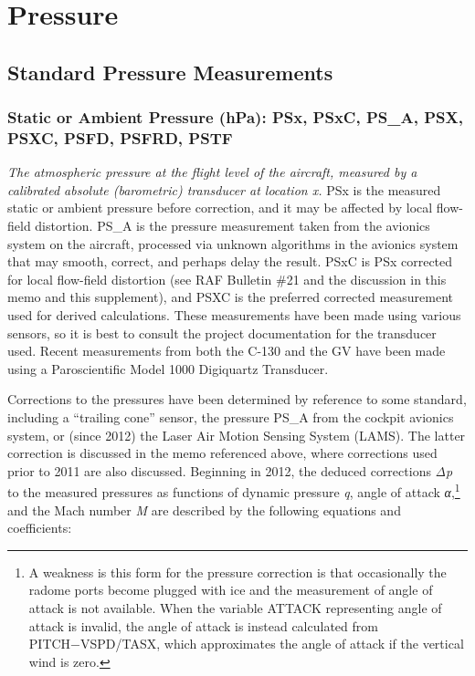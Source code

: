 \documentclass[
  english,
]{book}
\begin{document}
\hypertarget{pressure}{%
\section{Pressure}\label{pressure}}

\hypertarget{standard-pressure-measurements}{%
\subsection{Standard Pressure
Measurements}\label{standard-pressure-measurements}}

\hypertarget{psx}{%
\subsubsection*{Static or Ambient Pressure (hPa): PSx, PSxC, PS\_A, PSX,
PSXC, PSFD, PSFRD, PSTF}\label{psx}}

\emph{The atmospheric pressure at the flight level of the aircraft,
measured by a calibrated absolute (barometric) transducer at location
x.} PSx is the measured static or ambient pressure before correction,
and it may be affected by local flow-field distortion. PS\_A is the
pressure measurement taken from the avionics system on the aircraft,
processed via unknown algorithms in the avionics system that may smooth,
correct, and perhaps delay the result. PSxC is PSx corrected for local
flow-field distortion (see RAF Bulletin \#21 and the discussion in this
memo and this supplement), and PSXC is the preferred corrected
measurement used for derived calculations. These measurements have been
made using various sensors, so it is best to consult the project
documentation for the transducer used. Recent measurements from both the
C-130 and the GV have been made using a Paroscientific Model 1000
Digiquartz Transducer.

Corrections to the pressures have been determined by reference to some
standard, including a ``trailing cone'' sensor, the pressure PS\_A from
the cockpit avionics system, or (since 2012) the Laser Air Motion
Sensing System (LAMS). The latter correction is discussed in the memo
referenced above, where corrections used prior to 2011 are also
discussed. Beginning in 2012, the deduced corrections {\emph{Δp}} to the
measured pressures as functions of dynamic pressure {\emph{q},} angle of
attack {\emph{α},}\footnote{A weakness is this form for the pressure
  correction is that occasionally the radome ports become plugged with
  ice and the measurement of angle of attack is not available. When the
  variable ATTACK representing angle of attack is invalid, the angle of
  attack is instead calculated from PITCH{−}VSPD/TASX, which
  approximates the angle of attack if the vertical wind is zero.} and
the Mach number {\emph{M}} are described by the following equations and
coefficients:
\end{document}
